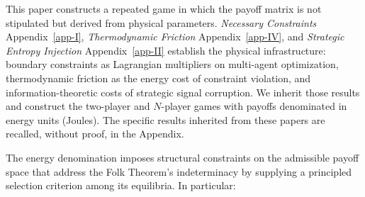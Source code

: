 \documentclass[11pt]{article}
\theoremstyle{plain}
\theoremstyle{definition}
\theoremstyle{remark}
\begin{document}
This paper constructs a repeated game in which the payoff matrix is not
stipulated but derived from physical parameters. \emph{Necessary
Constraints} Appendix~\ref{app-I}, \emph{Thermodynamic Friction}
Appendix~\ref{app-IV}, and \emph{Strategic Entropy Injection}
Appendix~\ref{app-II} establish the physical infrastructure: boundary
constraints as Lagrangian multipliers on multi-agent optimization,
thermodynamic friction as the energy cost of constraint violation, and
information-theoretic costs of strategic signal corruption. We inherit
those results and construct the two-player and \(N\)-player games with
payoffs denominated in energy units (Joules). The specific results
inherited from these papers are recalled, without proof, in the
Appendix.

The energy denomination imposes structural constraints on the admissible
payoff space that address the Folk Theorem's indeterminacy by supplying
a principled selection criterion among its equilibria. In particular:
\end{document}
